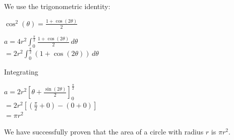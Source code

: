 We use the trigonometric identity:
\begin{center}
$\cos^2(\theta) = \frac{1 + \cos(2\theta)}{2}$
\end{center}
\begin{center}
$a = 4r^2 \int_0^{\frac{\pi}{2}} \frac{1 + \cos(2\theta)}{2} \, d\theta$
\\
$= 2r^2 \int_0^{\frac{\pi}{2}} (1 + \cos(2\theta)) \, d\theta$
\end{center}
Integrating
\begin{center}
$a = 2r^2 \left[ \theta + \frac{\sin(2\theta)}{2} \right]_0^{\frac{\pi}{2}}$
\\
$= 2r^2 \left[ \left( \frac{\pi}{2} + 0 \right) - (0 + 0) \right]$
\\
$= \pi r^2$
\end{center}
We have successfully proven that the area of a circle with radius $r$ is $\pi r^2$.
